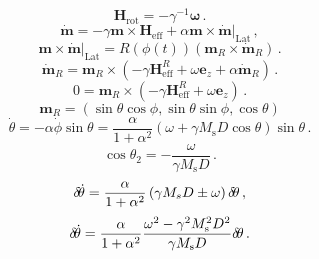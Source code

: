 \documentclass{article}
\begin{document}
\begin{equation}
\boldsymbol{H}_{\mathrm{rot}}=-\gamma^{-1}\boldsymbol{\omega}\,.
\end{equation}
\begin{equation}
\dot{\boldsymbol{m}}=-\gamma\boldsymbol{m}\times\boldsymbol{H}_{\mathrm{eff}}+\alpha\left.\boldsymbol{m}\times\dot{\boldsymbol{m}}\right|_{\mathrm{Lat}}\,,
\end{equation}
\begin{equation}
\left.\boldsymbol{m}\times\dot{\boldsymbol{m}}\right|_{\mathrm{Lat}}=R(\phi(t))\left(\boldsymbol{m}_{R}\times\dot{\boldsymbol{m}}_{R}\right)\,.
\end{equation}
\begin{equation}
\dot{\boldsymbol{m}}_{R}=\boldsymbol{m}_{R}\times\left(-\gamma\boldsymbol{H}_{\mathrm{eff}}^{R}+\omega\boldsymbol{e}_{z}+\alpha\dot{\boldsymbol{m}}_{R}\right)\,.
\end{equation}
\begin{equation}
0=\boldsymbol{m}_{R}\times\left(-\gamma\boldsymbol{H}_{\mathrm{eff}}^{R}+\omega\boldsymbol{e}_{z}\right)\,.
\end{equation}
\begin{equation}
\boldsymbol{m}_{R}=(\sin\theta\cos\phi,\sin\theta\sin\phi,\cos\theta)
\end{equation}
\begin{equation}
\dot{\theta}=-\alpha\dot{\phi}\sin\theta=\frac{\alpha}{1+\alpha^{2}}\left(\omega+\gamma M_{\mathrm{s}}D\cos\theta\right)\sin\theta\,.
\end{equation}
\begin{equation}
\cos\theta_{2}=-\frac{\omega}{\gamma M_{\mathrm{s}}D}\,.
\end{equation}
\begin{equation}
\delta\negthinspace\dot{\theta}=\frac{\alpha}{1+\alpha^{2}}\left(\gamma M_{s}D\pm\omega\right)\delta\negthinspace\theta\,,
\end{equation}
\begin{equation}
\delta\negthinspace\dot{\theta}=\frac{\alpha}{1+\alpha^{2}}\frac{\omega^{2}-\gamma^{2}M_{\mathrm{s}}^{2}D^{2}}{\gamma M_{\mathrm{s}}D}\delta\negthinspace\theta\,.
\end{equation}
\end{document}
